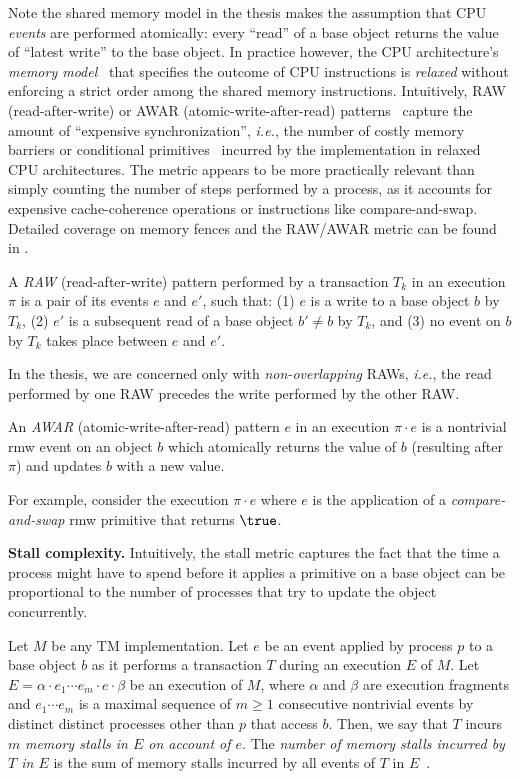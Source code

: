 Note the shared memory model in the thesis makes the assumption that CPU \emph{events} are performed atomically:
every ``read'' of a base object returns the value of ``latest write'' to the base object. In practice however,
the CPU architecture's \emph{memory model}~\cite{AdveG96} that specifies the outcome of CPU instructions
is \emph{relaxed} without enforcing a strict order among the shared memory instructions.
Intuitively, RAW (read-after-write) or AWAR (atomic-write-after-read)
patterns~\cite{AGK11-popl} capture the amount of ``expensive
synchronization'', \emph{i.e.}, the number of costly memory barriers or conditional primitives~\cite{AdveG96} incurred by the
implementation in relaxed CPU architectures.
The metric appears to be more practically relevant than simply counting the number of steps performed by a process, 
as it accounts for expensive cache-coherence operations or instructions like compare-and-swap.
Detailed coverage on memory fences and the RAW/AWAR metric can be found in \cite{McKenney10}.
\begin{definition}
A \emph{RAW} (read-after-write) pattern  performed by a transaction
$T_k$ in an execution $\pi$ 
is a pair of its events $e$ and $e'$, such that: (1) $e$ is a write to a
base object $b$ by $T_k$, 
(2) $e'$ is a subsequent read of a base object $b'\neq b$ by $T_k$, and 
(3) no event on $b$ by $T_k$ takes place between $e$ and $e'$. 
\end{definition}
In the thesis, we are concerned only with \emph{non-overlapping} RAWs,
\emph{i.e.}, the read performed by one RAW precedes the write 
performed by the other RAW.
\begin{definition}
An \emph{AWAR} (atomic-write-after-read) pattern $e$ in an execution
$\pi\cdot e$ is a nontrivial rmw event on an object $b$ which
atomically returns the value of $b$ (resulting after $\pi$) and updates $b$ with a
new value.  
\end{definition}
For example, consider the execution $\pi\cdot e$ where $e$ is the application of a \emph{compare-and-swap} rmw primitive that
returns $\true$.

\vspace{1mm}\noindent\textbf{Stall complexity.}
Intuitively, the stall metric captures the fact that the time a process might have to spend before it applies a 
primitive on a base object can be proportional to the number of processes that try to update the object concurrently.  

Let $M$ be any TM implementation.
Let $e$ be an event applied by process $p$ to a base object $b$ as it performs a transaction $T$ during an execution $E$ of $M$.
Let $E=\alpha\cdot e_1\cdots e_m \cdot e \cdot \beta$ be an execution of $M$, where $\alpha$ and $\beta$ are execution 
fragments and $e_1\cdots e_m$
is a maximal sequence of $m\geq 1$ consecutive nontrivial events by distinct distinct processes other than $p$ that access $b$.
Then, we say that $T$ incurs $m$ \emph{memory stalls in $E$ on account of $e$}.
The \emph{number of memory stalls incurred by $T$ in $E$} is the sum of memory stalls incurred by all events of $T$ in $E$~\cite{G05,AGHK09}.

